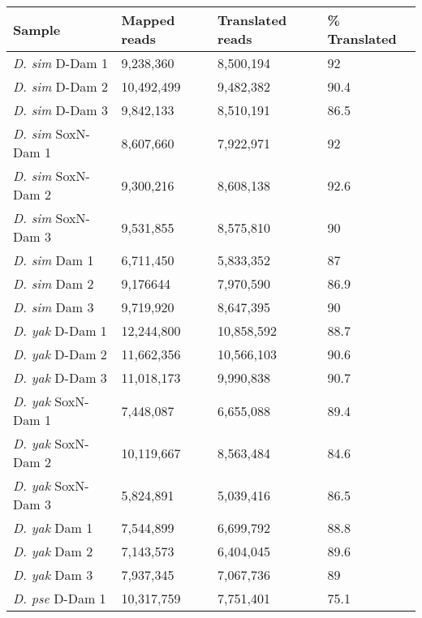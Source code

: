 \begin{table}[h]
\centering
\begin{tabular}{|l|l|l|l|}
\hline
\textbf{Sample}            & \textbf{Mapped reads} & \textbf{Translated reads} & \textbf{\% Translated} \\ \hline
\emph{D. sim} D-Dam 1    & 9,238,360    & 8,500,194        & 92            \\ \hline
\emph{D. sim} D-Dam 2    & 10,492,499   & 9,482,382        & 90.4          \\ \hline
\emph{D. sim} D-Dam 3    & 9,842,133    & 8,510,191        & 86.5          \\ \hline
\emph{D. sim} SoxN-Dam 1 & 8,607,660    & 7,922,971        & 92            \\ \hline
\emph{D. sim} SoxN-Dam 2 & 9,300,216    & 8,608,138        & 92.6          \\ \hline
\emph{D. sim} SoxN-Dam 3 & 9,531,855    & 8,575,810        & 90            \\ \hline
\emph{D. sim} Dam 1      & 6,711,450    & 5,833,352        & 87            \\ \hline
\emph{D. sim} Dam 2      & 9,176644     & 7,970,590        & 86.9          \\ \hline
\emph{D. sim} Dam 3      & 9,719,920    & 8,647,395        & 90            \\ \hline
\emph{D. yak} D-Dam 1    & 12,244,800   & 10,858,592       & 88.7          \\ \hline
\emph{D. yak} D-Dam 2    & 11,662,356   & 10,566,103       & 90.6          \\ \hline
\emph{D. yak} D-Dam 3    & 11,018,173   & 9,990,838        & 90.7          \\ \hline
\emph{D. yak} SoxN-Dam 1 & 7,448,087    & 6,655,088        & 89.4          \\ \hline
\emph{D. yak} SoxN-Dam 2 & 10,119,667   & 8,563,484        & 84.6          \\ \hline
\emph{D. yak} SoxN-Dam 3 & 5,824,891    & 5,039,416        & 86.5          \\ \hline
\emph{D. yak} Dam 1      & 7,544,899    & 6,699,792        & 88.8          \\ \hline
\emph{D. yak} Dam 2      & 7,143,573    & 6,404,045        & 89.6          \\ \hline
\emph{D. yak} Dam 3      & 7,937,345    & 7,067,736        & 89            \\ \hline
\emph{D. pse} D-Dam 1    & 10,317,759   & 7,751,401        & 75.1          \\ \hline

\end{tabular}
\end{table}
